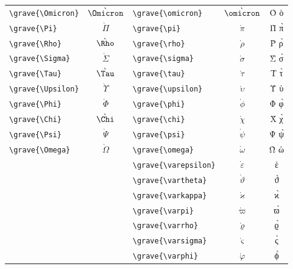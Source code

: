 \documentclass[12pt,a4paper]{article}
\begin{document}
\begin{longtable}{|l|c|l|c|c|}
\verb|\grave{\Omicron}|    & $\grave{\Omicron}$ & \verb|\grave{\omicron}|    & $\grave{\omicron}$    & Ὸ ὸ \\
\verb|\grave{\Pi}|         & $\grave{\Pi}$      & \verb|\grave{\pi}|         & $\grave{\pi}$         & Π̀ π̀ \\
\verb|\grave{\Rho}|        & $\grave{\Rho}$     & \verb|\grave{\rho}|        & $\grave{\rho}$        & Ρ̀ ρ̀ \\
\verb|\grave{\Sigma}|      & $\grave{\Sigma}$   & \verb|\grave{\sigma}|      & $\grave{\sigma}$      & Σ̀ σ̀ \\
\verb|\grave{\Tau}|        & $\grave{\Tau}$     & \verb|\grave{\tau}|        & $\grave{\tau}$        & Τ̀ τ̀ \\
\verb|\grave{\Upsilon}|    & $\grave{\Upsilon}$ & \verb|\grave{\upsilon}|    & $\grave{\upsilon}$    & Ὺ ὺ \\
\verb|\grave{\Phi}|        & $\grave{\Phi}$     & \verb|\grave{\phi}|        & $\grave{\phi}$        & Φ̀ φ̀ \\
\verb|\grave{\Chi}|        & $\grave{\Chi}$     & \verb|\grave{\chi}|        & $\grave{\chi}$        & Χ̀ χ̀ \\
\verb|\grave{\Psi}|        & $\grave{\Psi}$     & \verb|\grave{\psi}|        & $\grave{\psi}$        & Ψ̀ ψ̀ \\
\verb|\grave{\Omega}|      & $\grave{\Omega}$   & \verb|\grave{\omega}|      & $\grave{\omega}$      & Ὼ ὼ \\
                           &                    & \verb|\grave{\varepsilon}| & $\grave{\varepsilon}$ & ὲ \\
                           &                    & \verb|\grave{\vartheta}|   & $\grave{\vartheta}$   & ϑ̀ \\
                           &                    & \verb|\grave{\varkappa}|   & $\grave{\varkappa}$   & ϰ̀ \\
                           &                    & \verb|\grave{\varpi}|      & $\grave{\varpi}$      & ϖ̀ \\
                           &                    & \verb|\grave{\varrho}|     & $\grave{\varrho}$     & ϱ̀ \\
                           &                    & \verb|\grave{\varsigma}|   & $\grave{\varsigma}$   & ς̀ \\
                           &                    & \verb|\grave{\varphi}|     & $\grave{\varphi}$     & ϕ̀ \\
\hline
\end{longtable}
\end{document}
